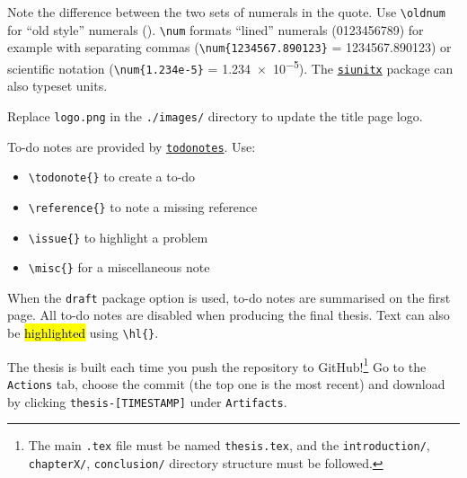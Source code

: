 
Note the difference between the two sets of numerals in the quote. Use \verb|\oldnum| for
``old style'' numerals (). \verb|\num| formats ``lined'' numerals (0123456789)
for example with separating commas (\verb|\num{1234567.890123}| = \num{1234567.890123}) or 
scientific notation (\verb|\num{1.234e-5}| = \num{1.234e-5}). The
\href{https://ctan.org/pkg/siunitx}{\texttt{siunitx}} package can also typeset units.


Replace \texttt{logo.png} in the \texttt{./images/} directory to update the title page logo.

\label{sec:todonotes}

To-do notes are provided by \href{https://ctan.org/pkg/todonotes}{\texttt{todonotes}}. Use:
\begin{itemize}
  \item \verb|\todonote{}| to create a to-do
  \item \verb|\reference{}| to note a missing reference
  \item \verb|\issue{}| to highlight a problem
  \item \verb|\misc{}| for a miscellaneous note
\end{itemize}

When the \texttt{draft} package option is used, to-do notes are summarised on the first
page. All to-do notes are disabled when producing the final thesis. Text can also be 
\hl{highlighted} using \verb|\hl{}|. 



The thesis is built each time you push the repository to GitHub!\footnote{The main \texttt{.tex}
file must be named \texttt{thesis.tex}, and the \texttt{introduction/}, \texttt{chapterX/},
\texttt{conclusion/} directory structure must be followed.} Go to the \texttt{Actions}
tab, choose the commit (the top one is the most recent) and download by clicking \texttt{thesis-[TIMESTAMP]}
under \texttt{Artifacts}.


